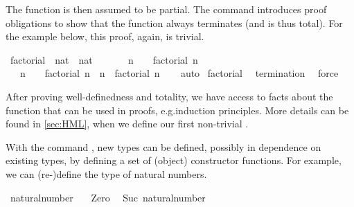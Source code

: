 \begin{isabellebody}
\begin{isamarkuptext}
The function is then assumed to be partial. The command  introduces proof obligations to show that the function always terminates (and is thus total). For the example below, this proof, again, is trivial.%
\end{isamarkuptext}\isamarkuptrue%
%
\isadelimvisible
%
\endisadelimvisible
%
\isatagvisible
{}\isamarkupfalse%
\ factorial\ {\isacharcolon}{\kern0pt}{\isacharcolon}{\kern0pt}\ {\isacartoucheopen}nat\ {\isasymRightarrow}\ nat{\isacartoucheclose}\isanewline
\ \ \isanewline
\ \ \ \ {\isacartoucheopen}n\ {\isacharequal}{\kern0pt}\ {}\ {\isasymLongrightarrow}\ factorial\ n\ {\isacharequal}{\kern0pt}\ {}{\isacartoucheclose}\isanewline
\ \ {\isacharbar}{\kern0pt}\ {\isacartoucheopen}n\ {\isachargreater}{\kern0pt}\ {}\ {\isasymLongrightarrow}\ factorial\ n\ {\isacharequal}{\kern0pt}\ n\ {\isacharasterisk}{\kern0pt}\ factorial\ {\isacharparenleft}{\kern0pt}n{\isacharminus}{\kern0pt}{}{\isacharparenright}{\kern0pt}{\isacartoucheclose}\isanewline
\ \ \isamarkupfalse%
\ auto\isanewline
\isanewline
{}\isamarkupfalse%
\ factorial\ \isamarkupfalse%
\ {\isachardoublequoteopen}termination{\isachardoublequoteclose}\ \isamarkupfalse%
\ force%
\endisatagvisible
{\isafoldvisible}%
%
\isadelimvisible
%
\endisadelimvisible
%
\begin{isamarkuptext}%
After proving well-definedness and totality, we have access to facts about the function that can be used in proofs, e.g.\@ induction principles. More details can be found in \cref{sec:HML}, when we define our first non-trivial .%
\end{isamarkuptext}\isamarkuptrue%
%
\isadelimdocument
%
\endisadelimdocument
%
\isatagdocument
%
\isamarkuptrue%
%
\endisatagdocument
{\isafolddocument}%
%
\isadelimdocument
%
\endisadelimdocument
%
\begin{isamarkuptext}%
With the command , new types can be defined, possibly in dependence on existing types, by defining a set of (object) constructor functions. For example, we can (re-)define the type of natural numbers.%
\end{isamarkuptext}\isamarkuptrue%
\isamarkupfalse%
\ natural{\isacharunderscore}{\kern0pt}number\ {\isacharequal}{\kern0pt}\isanewline
\ \ Zero\ %
\isanewline
{\isacharbar}{\kern0pt}\ Suc\ {\isacartoucheopen}natural{\isacharunderscore}{\kern0pt}number{\isacartoucheclose}\ %

\end{isabellebody}
